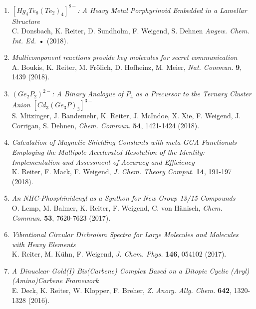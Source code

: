 \begin{enumerate}

\item \textit{$[Hg_4Te_8(Te_2)_4]^{8-}$: A Heavy Metal Porphyrinoid Embedded in a Lamellar Structure}\\
C. Donsbach, K. Reiter, D. Sundholm, F. Weigend, S. Dehnen \textit{Angew. Chem. Int. Ed.} \textbf{•} (2018).

\item \textit{Multicomponent reactions provide key molecules for secret communication}\\ 
A. Boukis, K. Reiter, M. Frölich, D. Hofheinz, M. Meier, \textit{Nat. Commun.} \textbf{9}, 1439 (2018).

\item \textit{$(Ge_2P_2)^{2-}$: A Binary Analogue of $P_4$ as a Precursor to the Ternary Cluster Anion $[Cd_3(Ge_3P)_3]^{3-}$}\\
S. Mitzinger, J. Bandemehr, K. Reiter, J. McIndoe, X. Xie, F. Weigend, J. Corrigan, S. Dehnen, \textit{Chem. Commun.} \textbf{54}, 1421-1424 (2018).

\item \textit{Calculation of Magnetic Shielding Constants with meta-GGA Functionals Employing the Multipole-Accelerated Resolution of the Identity: Implementation and Assessment of Accuracy and Efficiency}\\ 
K. Reiter, F. Mack, F. Weigend, \textit{J. Chem. Theory Comput.} \textbf{14}, 191-197 (2018).

\item \textit{An NHC-Phosphinidenyl as a Synthon for New Group 13/15 Compounds}\\
O. Lemp, M. Balmer, K. Reiter, F. Weigend, C. von Hänisch, \textit{Chem. Commun.} \textbf{53}, 7620-7623 (2017).

\item \textit{Vibrational Circular Dichroism Spectra for Large Molecules and Molecules with Heavy Elements}\\
K. Reiter, M. Kühn, F. Weigend, \textit{J. Chem. Phys.} \textbf{146}, 054102 (2017).

\item \textit{A Dinuclear Gold(I) Bis(Carbene) Complex Based on a Ditopic Cyclic (Aryl)\\(Amino)Carbene Framework}\\
E. Deck, K. Reiter, W. Klopper, F. Breher, \textit{Z. Anorg. Allg. Chem.} \textbf{642}, 1320-1328 (2016).


\end{enumerate}
